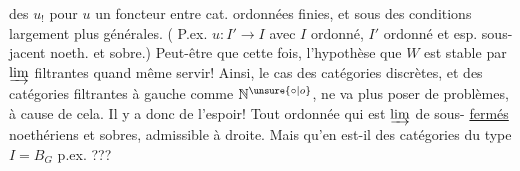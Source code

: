 des $u_!$ pour $u$ un foncteur entre cat. ordonnées finies, et sous des conditions largement plus générales. ( P.ex. $u:I'\longrightarrow I$ avec $I$ ordonné, $I'$ ordonné et esp. sous-jacent noeth. et sobre.) Peut-être que cette fois, l'hypothèse que $W$ est stable par $\varinjlim$ filtrantes  quand même servir! Ainsi, le cas des catégories discrètes, et des catégories filtrantes à gauche comme $\mathbb N^{\unsure{\circ|o}}$, ne va plus poser de problèmes, à cause de cela. Il y a donc de l'espoir! Tout   ordonnée qui est $\varinjlim$  de sous-  \uline{fermés} noethériens et sobres,  admissible à droite. Mais qu'en est-il des catégories du type $I=B_G$ p.ex. ???

